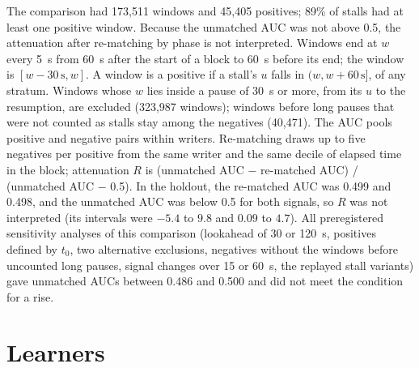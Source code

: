 The comparison had 173,511 windows and 45,405 positives; 89\% of stalls had at least one positive window. Because the
unmatched AUC was not above 0.5, the attenuation after re-matching by phase is not interpreted. Windows end at $w$ every 5~s from 60~s after the start of a block to 60~s before its end; the window is $[w - 30\,
\mathrm{s}, w]$. A window is a positive if a stall's $u$ falls in $(w, w + 60\,\mathrm{s}]$, of any stratum. Windows
whose $w$ lies inside a pause of 30~s or more, from its $u$ to the resumption, are excluded (323,987 windows); windows
before long pauses that were not counted as stalls stay among the negatives (40,471). The AUC pools positive and
negative pairs within writers. Re-matching draws up to five negatives per positive from the same writer and the same
decile of elapsed time in the block; attenuation $R$ is (unmatched AUC $-$ re-matched AUC) / (unmatched AUC $-$ 0.5).
In the holdout, the re-matched AUC was 0.499 and 0.498, and the unmatched AUC was below 0.5 for both signals, so $R$ was
not interpreted (its intervals were $-5.4$ to $9.8$ and $0.09$ to $4.7$). All preregistered sensitivity analyses of this
comparison (lookahead of 30 or 120~s, positives defined by $t_0$, two alternative exclusions, negatives without the
windows before uncounted long pauses, signal changes over 15 or 60~s, the replayed stall variants) gave unmatched AUCs
between 0.486 and 0.500 and did not meet the condition for a rise.

\section{Learners}
\label{app:learners}

